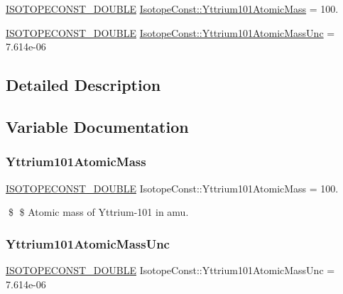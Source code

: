 \begin{DoxyCompactItemize}
\item 
\mbox{\hyperlink{group___isotope_const-_macros_ga8f45a7272ce02c0b4c65c44636ed719a}{I\+S\+O\+T\+O\+P\+E\+C\+O\+N\+S\+T\+\_\+\+D\+O\+U\+B\+LE}} \mbox{\hyperlink{group___isotope_const-_yttrium-_y101_gab9bbb9cff9970f879b40e1856f1c3bc0}{Isotope\+Const\+::\+Yttrium101\+Atomic\+Mass}} = 100.
\item 
\mbox{\hyperlink{group___isotope_const-_macros_ga8f45a7272ce02c0b4c65c44636ed719a}{I\+S\+O\+T\+O\+P\+E\+C\+O\+N\+S\+T\+\_\+\+D\+O\+U\+B\+LE}} \mbox{\hyperlink{group___isotope_const-_yttrium-_y101_ga99cfbf7114ee3bcdb301a599b7959546}{Isotope\+Const\+::\+Yttrium101\+Atomic\+Mass\+Unc}} = 7.\+614e-\/06
\end{DoxyCompactItemize}


\subsection{Detailed Description}


\subsection{Variable Documentation}
\mbox{\label{group___isotope_const-_yttrium-_y101_gab9bbb9cff9970f879b40e1856f1c3bc0}} 
\subsubsection{\texorpdfstring{Yttrium101\+Atomic\+Mass}{Yttrium101AtomicMass}}
{\footnotesize\ttfamily \mbox{\hyperlink{group___isotope_const-_macros_ga8f45a7272ce02c0b4c65c44636ed719a}{I\+S\+O\+T\+O\+P\+E\+C\+O\+N\+S\+T\+\_\+\+D\+O\+U\+B\+LE}} Isotope\+Const\+::\+Yttrium101\+Atomic\+Mass = 100.}

\$ \$ Atomic mass of Yttrium-\/101 in amu. \mbox{\label{group___isotope_const-_yttrium-_y101_ga99cfbf7114ee3bcdb301a599b7959546}} 
\subsubsection{\texorpdfstring{Yttrium101\+Atomic\+Mass\+Unc}{Yttrium101AtomicMassUnc}}
{\footnotesize\ttfamily \mbox{\hyperlink{group___isotope_const-_macros_ga8f45a7272ce02c0b4c65c44636ed719a}{I\+S\+O\+T\+O\+P\+E\+C\+O\+N\+S\+T\+\_\+\+D\+O\+U\+B\+LE}} Isotope\+Const\+::\+Yttrium101\+Atomic\+Mass\+Unc = 7.\+614e-\/06}


